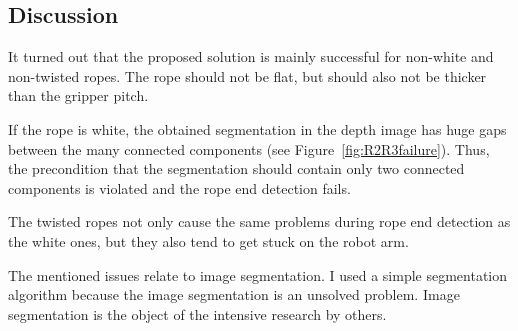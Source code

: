     \subsection{Discussion}
        It turned out that the proposed solution is mainly successful for non-white and non-twisted ropes. The rope should not be flat, but should also not be thicker than the gripper pitch.

        If the rope is white, the obtained segmentation in the depth image has huge gaps between the many connected components (see Figure~\ref{fig:R2R3failure}). Thus, the precondition that the segmentation should contain only two connected components is violated and the rope end detection fails.

        The twisted ropes not only cause the same problems during rope end detection as the white ones, but they also tend to get stuck on the robot arm.
        
        The mentioned issues relate to image segmentation. I used a simple segmentation algorithm because the image segmentation is an unsolved problem. Image segmentation is the object of the intensive research by others.

